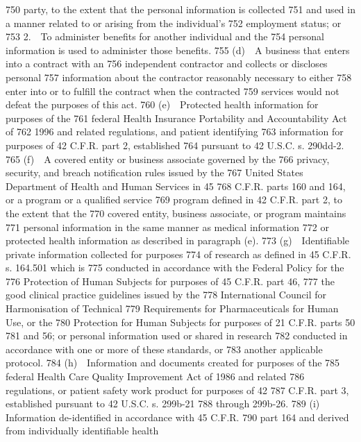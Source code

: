   750  party, to the extent that the personal information is collected
  751  and used in a manner related to or arising from the individual’s
  752  employment status; or
  753         2. To administer benefits for another individual and the
  754  personal information is used to administer those benefits.
  755         (d) A business that enters into a contract with an
  756  independent contractor and collects or discloses personal
  757  information about the contractor reasonably necessary to either
  758  enter into or to fulfill the contract when the contracted
  759  services would not defeat the purposes of this act.
  760         (e) Protected health information for purposes of the
  761  federal Health Insurance Portability and Accountability Act of
  762  1996 and related regulations, and patient identifying
  763  information for purposes of 42 C.F.R. part 2, established
  764  pursuant to 42 U.S.C. s. 290dd-2.
  765         (f) A covered entity or business associate governed by the
  766  privacy, security, and breach notification rules issued by the
  767  United States Department of Health and Human Services in 45
  768  C.F.R. parts 160 and 164, or a program or a qualified service
  769  program defined in 42 C.F.R. part 2, to the extent that the
  770  covered entity, business associate, or program maintains
  771  personal information in the same manner as medical information
  772  or protected health information as described in paragraph (e).
  773         (g) Identifiable private information collected for purposes
  774  of research as defined in 45 C.F.R. s. 164.501 which is
  775  conducted in accordance with the Federal Policy for the
  776  Protection of Human Subjects for purposes of 45 C.F.R. part 46,
  777  the good clinical practice guidelines issued by the
  778  International Council for Harmonisation of Technical
  779  Requirements for Pharmaceuticals for Human Use, or the
  780  Protection for Human Subjects for purposes of 21 C.F.R. parts 50
  781  and 56; or personal information used or shared in research
  782  conducted in accordance with one or more of these standards, or
  783  another applicable protocol.
  784         (h) Information and documents created for purposes of the
  785  federal Health Care Quality Improvement Act of 1986 and related
  786  regulations, or patient safety work product for purposes of 42
  787  C.F.R. part 3, established pursuant to 42 U.S.C. s. 299b-21
  788  through 299b-26.
  789         (i) Information de-identified in accordance with 45 C.F.R.
  790  part 164 and derived from individually identifiable health
